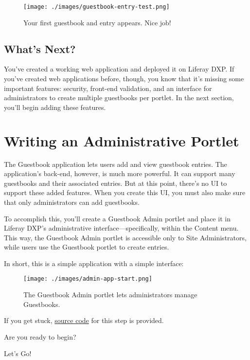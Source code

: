\begin{figure}
\centering
\texttt{[image: ./images/guestbook-entry-test.png]}
\caption{Your first guestbook and entry appears. Nice job!}
\end{figure}

\section{What's Next?}\label{whats-next}

You've created a working web application and deployed it on Liferay DXP.
If you've created web applications before, though, you know that it's
missing some important features: security, front-end validation, and an
interface for administrators to create multiple guestbooks per portlet.
In the next section, you'll begin adding these features.

\chapter{Writing an Administrative
Portlet}\label{writing-an-administrative-portlet}

The Guestbook application lets users add and view guestbook entries. The
application's back-end, however, is much more powerful. It can support
many guestbooks and their associated entries. But at this point, there's
no UI to support these added features. When you create this UI, you must
also make sure that only administrators can add guestbooks.

To accomplish this, you'll create a Guestbook Admin portlet and place it
in Liferay DXP's administrative interface---specifically, within the
Content menu. This way, the Guestbook Admin portlet is accessible only
to Site Administrators, while users use the Guestbook portlet to create
entries.

In short, this is a simple application with a simple interface:

\begin{figure}
\centering
\texttt{[image: ./images/admin-app-start.png]}
\caption{The Guestbook Admin portlet lets administrators manage
Guestbooks.}
\end{figure}

If you get stuck,
\href{https://github.com/liferay/liferay-docs/tree/master/en/developer/tutorials/code/guestbook/05-admin-portlet}{source
code} for this step is provided.

Are you ready to begin?

Let's Go!{}


